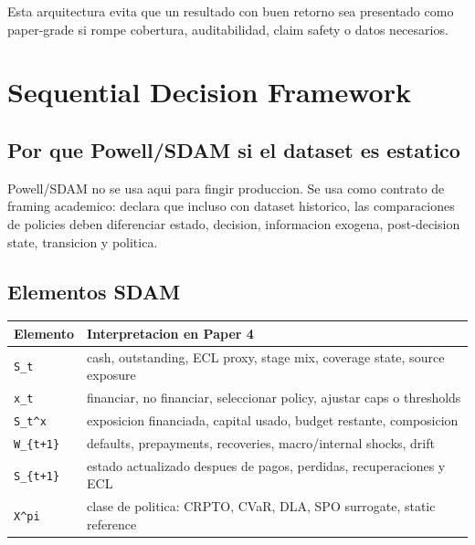 \documentclass[
  spanish,
  11pt,
  letterpaper,
]{scrbook}
\newcounter{none} %
\theoremstyle{plain}
\theoremstyle{remark}
\begin{document}
Esta arquitectura evita que un resultado con buen retorno sea presentado
como paper-grade si rompe cobertura, auditabilidad, claim safety o datos
necesarios.

\chapter{Sequential Decision
Framework}\label{sequential-decision-framework}

\section{Por que Powell/SDAM si el dataset es
estatico}\label{por-que-powellsdam-si-el-dataset-es-estatico}

Powell/SDAM no se usa aqui para fingir produccion. Se usa como contrato
de framing academico: declara que incluso con dataset historico, las
comparaciones de policies deben diferenciar estado, decision,
informacion exogena, post-decision state, transicion y politica.

\section{Elementos SDAM}\label{elementos-sdam}

{\def\LTcaptype{none} %
\begin{longtable}[]{@{}
  >{\raggedright\arraybackslash}p{}
  >{\raggedright\arraybackslash}p{}@{}}
\toprule\noalign{}
\begin{minipage}[b]{\linewidth}\raggedright
Elemento
\end{minipage} & \begin{minipage}[b]{\linewidth}\raggedright
Interpretacion en Paper 4
\end{minipage} \\
\midrule\noalign{}
\endhead
\bottomrule\noalign{}
\endlastfoot
\texttt{S\_t} & cash, outstanding, ECL proxy, stage mix, coverage state,
source exposure \\
\texttt{x\_t} & financiar, no financiar, seleccionar policy, ajustar
caps o thresholds \\
\texttt{S\_t\^{}x} & exposicion financiada, capital usado, budget
restante, composicion \\
\texttt{W\_\{t+1\}} & defaults, prepayments, recoveries, macro/internal
shocks, drift \\
\texttt{S\_\{t+1\}} & estado actualizado despues de pagos, perdidas,
recuperaciones y ECL \\
\texttt{X\^{}pi} & clase de politica: CRPTO, CVaR, DLA, SPO surrogate,
static reference \\
\end{longtable}
}
\end{document}

